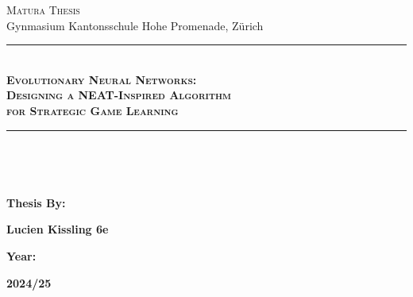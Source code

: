 \documentclass[12pt]{report}
\begin{document}
    \begin{titlepage}
        \BgThispage
        \color{white} {
            \begin{center}
                \Large \textsc{Matura Thesis}\\Gynmasium Kantonsschule Hohe Promenade, Zürich\\
                \rule[0.1cm]{16.5cm}{0.1mm}\\
                \vspace{3cm}
                \Huge \textbf{ \textsc{Evolutionary Neural Networks: \\Designing a NEAT-Inspired Algorithm \\for Strategic Game Learning}}\\
                \vspace{3cm}
                \rule[0.1cm]{16.5cm}{0.1mm}\\
            \end{center}
            \vspace{10cm}\\
            \begin{minipage}[t]{0.47\textwidth}
                \large\textbf {Thesis By:}\\
            \end{minipage}
            \hfill
            \begin{minipage}[t]{0.47\textwidth}
                \raggedleft
                \large\textbf {Lucien Kissling 6e}\\
            \end{minipage}
            \begin{minipage}[t]{0.47\textwidth}
                \large \textbf {Year:}\\
            \end{minipage}
            \hfill
            \begin{minipage}[t]{0.47\textwidth}
                \raggedleft
                \large \textbf {2024/25}\\
            \end{minipage}
            \begin{minipage}[t]{0.47\textwidth}

\end{minipage}}
\end{titlepage}
\end{document}
